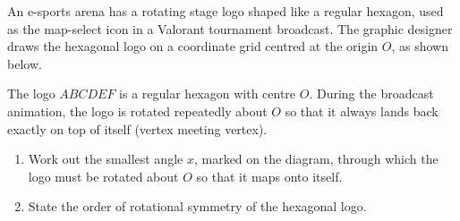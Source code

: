 \begin{question}
\noindent An e-sports arena has a rotating stage logo shaped like a regular hexagon, used as the map-select icon in a Valorant tournament broadcast. The graphic designer draws the hexagonal logo on a coordinate grid centred at the origin $O$, as shown below.

\begin{center}
\end{center}

\noindent The logo $ABCDEF$ is a regular hexagon with centre $O$. During the broadcast animation, the logo is rotated repeatedly about $O$ so that it always lands back exactly on top of itself (vertex meeting vertex).

\begin{enumerate}
    \item[(a)] Work out the smallest angle $x$, marked on the diagram, through which the logo must be rotated about $O$ so that it maps onto itself.

    \vspace{2.5cm}

    \item[(b)] State the order of rotational symmetry of the hexagonal logo.


\end{enumerate}
\end{question}
